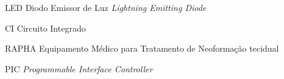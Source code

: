 \begin{siglas}
	\item LED       Diodo Emissor de Luz \textit{Lightning Emitting Diode}
    \item CI 		Circuito Integrado
    \item RAPHA 	Equipamento Médico para Tratamento de Neoformação tecidual
    \item PIC 		\textit{Programmable Interface Controller}
    \item
\end{siglas}
